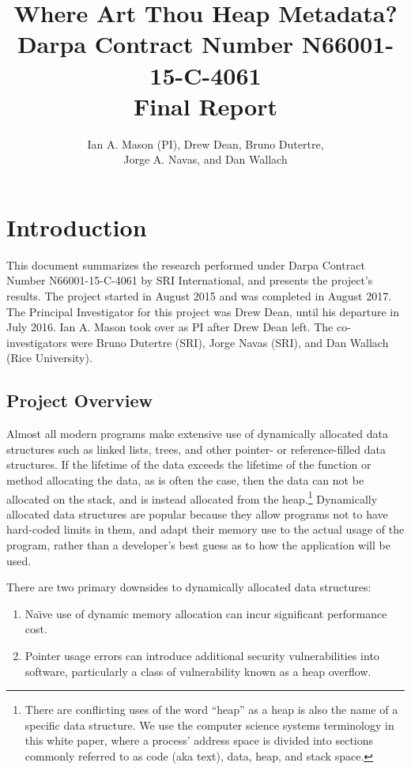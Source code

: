 \documentclass[12pt]{cslreport}
\title{{\bf Where Art Thou Heap Metadata?}\\[5mm]
\Large  Darpa Contract Number N66001-15-C-4061\\[5mm] 
Final Report}
\author{Ian A. Mason (PI), Drew Dean, Bruno Dutertre,\\
  Jorge A. Navas, and Dan Wallach}
\begin{document}
\pagestyle{plain}

\maketitle

\cleardoublepage
\tableofcontents
\listoffigures
\listoftables

\cleardoublepage


\chapter{Introduction}

This document summarizes the research performed under Darpa Contract
Number N66001-15-C-4061 by SRI International, and presents the
project's results. The project started in August 2015 and was
completed in August 2017. The Principal Investigator for this project
was Drew Dean, until his departure in July 2016. Ian A. Mason took
over as PI after Drew Dean left. The co-investigators were Bruno
Dutertre (SRI), Jorge Navas (SRI), and Dan Wallach (Rice University).


\section{Project Overview}

Almost all modern programs make extensive use of dynamically allocated
data structures  such as  linked lists, trees,  and other  pointer- or
reference-filled data structures. If the  lifetime of the data exceeds
the lifetime  of the  function or  method allocating  the data,  as is
often the case, then  the data can not be allocated  on the stack, and
is  instead allocated  from the  heap.\footnote{There are  conflicting
  uses of  the word ``heap'' as  a heap is  also the name of  a specific
  data structure. We  use the computer science  systems terminology in
  this white  paper, where  a process' address  space is  divided into
  sections commonly  referred to as  code (aka text), data,  heap, and
  stack  space.}  Dynamically  allocated data  structures are  popular
because they allow programs not to have hard-coded limits in them, and
adapt their memory use to the actual usage of the program, rather than
a  developer's best  guess as  to how  the application  will be  used.

There  are  two  primary   downsides  to  dynamically  allocated  data
structures:
\begin{enumerate}
\item Na\"{\i}ve use  of  dynamic  memory allocation  can  incur
significant  performance  cost.
\item Pointer usage errors can introduce additional security
  vulnerabilities into software, particularly a class of vulnerability
  known as a heap overflow.  
\end{enumerate}
\end{document}
